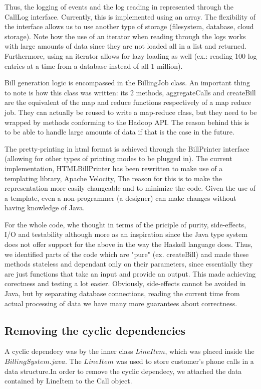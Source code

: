 \documentclass[11pt,twocolumn]{article} %
\begin{document}
Thus, the logging of events and the log reading in represented through the CallLog interface. Currently, this is implemented using an array.
The flexibility of the interface allows us to use another type of storage (filesystem, database, cloud storage). Note how the use of an iterator
when reading through the logs works with large amounts of data since they are not loaded all in a list and returned. Furthermore, using an iterator allows
for lazy loading as well (ex.: reading 100 log entries at a time from a database instead of all 1 million).

Bill generation logic is encompassed in the BillingJob class. An important thing to note is how this class was written: its 2 methods, aggregateCalls
and createBill are the equivalent of the map and reduce functions respectively of a map reduce job. They can actually be reused to write a map-reduce
class, but they need to be wrapped by methods conforming to the Hadoop API. The reason behind this is to be able to handle large amounts of data
if that is the case in the future. 

The pretty-printing in html format is achieved through the BillPrinter interface (allowing for other types of printing modes to be plugged in).
The current implementation, HTMLBillPrinter has been rewritten to make use of a templating library, Apache Velocity, The reason for this is to make
the representation more easily changeable and to minimize the code. Given the use of a template, even a non-programmer (a designer) can make changes 
without having knowledge of Java.

For the whole code, whe thought in terms of the priciple of purity, side-effects, I/O and testability although more as an inspiration since the
Java type system does not offer support for the above in the way the Haskell language does. Thus, we identified parts of the code which are
"pure" (ex. createBill) and made these methods stateless and dependant only on their parameters, since essentially they are just functions
that take an input and provide an output. This made achieving corectness and testing a lot easier. Obviously, side-effects cannot be avoided in Java,
but by separating database connections, reading the current time from actual processing of data we have many more guarantees about correctness.

\subsection{Removing the cyclic dependencies}
A cyclic dependecy was by the inner class $LineItem$, which was placed inside the $BillingSystem.java$.
The $LineItem$ was used to store customer's phone calls in a data structure.In order to remove the cyclic dependecy, we attached the
data contained by LineItem to the Call object.
\end{document}
